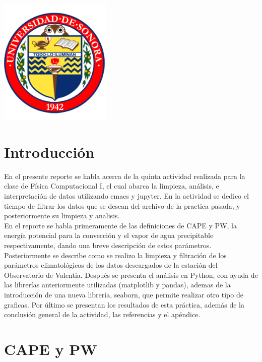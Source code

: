 \documentclass[12pt]{article}
\begin{document}
\begin{titlepage}
\includegraphics[width=0.4\textwidth]{logo.png}\\
 

\vfill %

\end{titlepage}

\section{Introducción}
En el presente reporte se habla acerca de la quinta actividad realizada para la clase de Física Computacional I, el cual abarca la limpieza, análisis, e interpretación de datos utilizando emacs y jupyter. En la actividad se dedico el tiempo de filtrar los datos que se desean del archivo de la practica pasada, y posteriormente su limpieza y analisis.\\ 

En el reporte se habla primeramente de las definiciones de CAPE y PW, la energía potencial para la convección y el vapor de agua precipitable respectivamente, dando una breve descripción de estos parámetros. Posteriormente se describe como se realizo la limpieza y filtración de los parámetros climatológicos de los datos descargados de la estación del Observatorio de Valentia. Después se presenta el análisis en Python, con ayuda de las librerías anteriormente utilizadas (matplotlib y pandas), ademas de la introducción de una nueva librería, seaborn, que permite realizar otro tipo de graficas. Por último se presentan los resultados de esta práctica, además de la conclusión general de la actividad, las referencias y el apéndice. 
    
\section{CAPE y PW}
\end{document}

